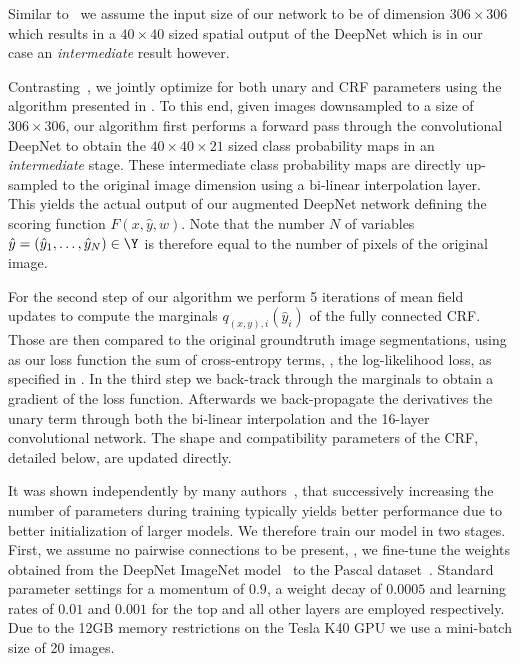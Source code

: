 Similar to~\cite{ChenARXIV2015b} we assume the input size of our network to be of dimension $306\times 306$ which results in a $40\times 40$ sized spatial output of the DeepNet which is in our case an \emph{intermediate} result however.

Contrasting~\cite{ChenARXIV2015b}, we jointly optimize for both unary and CRF parameters using the algorithm presented in . To this end, given images downsampled to a size of $306\times 306$, our algorithm first performs a forward pass through the convolutional DeepNet to obtain the $40\times40\times21$ sized class probability maps in an \emph{intermediate} stage. These intermediate class probability maps are directly  up-sampled to the original image dimension using a bi-linear interpolation layer. This yields the actual output of our augmented DeepNet network defining the scoring function $F(x,\hat y,w)$. Note that the number $N$ of variables $\hat y = (\hat y_1, \ldots, \hat y_N)\in\Y$ is therefore equal to the number of pixels of the original image.

For the second step of our algorithm we perform 5 iterations of mean field updates to compute the marginals $q_{(x,y),i}(\hat y_i)$ of the fully connected CRF. Those are then compared to the original groundtruth image segmentations, using as our loss function the sum of cross-entropy terms, \ie, the log-likelihood loss, as specified in . In the third step we back-track through the marginals to obtain a gradient of the loss function. Afterwards we back-propagate the derivatives \wrt the unary term through both the bi-linear interpolation and the 16-layer convolutional network. The shape and compatibility parameters of the CRF, detailed below, are updated directly.





It was shown independently by many authors~\cite{SimonyanARXIV2014,ChenARXIV2015}, that successively increasing the number of parameters during training typically yields better performance due to better initialization of larger models. We therefore train our model in two stages. First, we assume no pairwise connections to be present, \ie, we fine-tune the weights obtained from the DeepNet ImageNet model~\cite{SimonyanARXIV2014,ILSVRCarxiv14} to the Pascal dataset~\cite{pascal-voc-2012}. Standard parameter settings for a momentum of $0.9$, a weight decay of $0.0005$ and learning rates of $0.01$ and $0.001$ for the top and all other layers  are employed respectively. Due to the 12GB memory restrictions on the Tesla K40 GPU we use a mini-batch size of 20 images.

